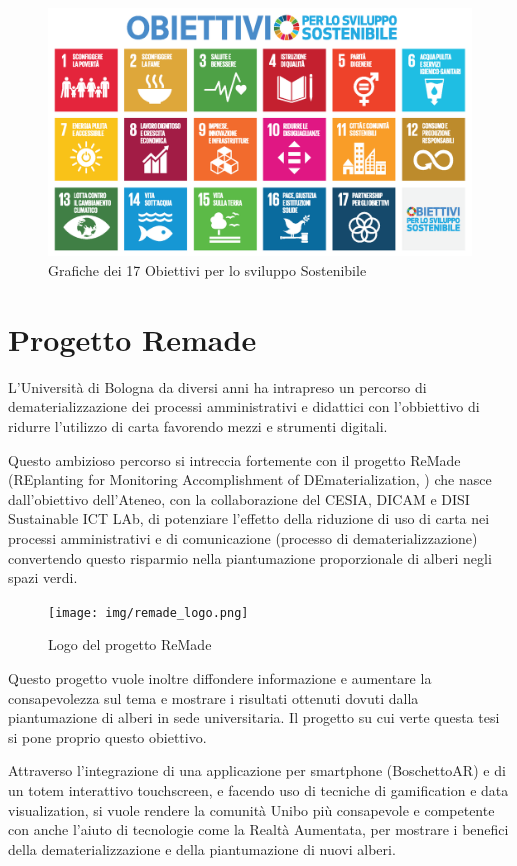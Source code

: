 \begin{figure}
    \centering
    \includegraphics[width=\textwidth]{img/SDG_Poster.png}
    \caption{Grafiche dei 17 Obiettivi per lo sviluppo Sostenibile}
    \label{fig:sdgs}
\end{figure}

\section{Progetto Remade}
L'Università di Bologna da diversi anni ha intrapreso un percorso di dematerializzazione dei processi amministrativi e didattici con l'obbiettivo di ridurre l'utilizzo di carta favorendo mezzi e strumenti digitali.

Questo ambizioso percorso si intreccia fortemente con il progetto ReMade (REplanting for Monitoring Accomplishment of DEmaterialization, \cite{remade_project}) che nasce dall'obiettivo dell'Ateneo, con la collaborazione del CESIA, DICAM e DISI Sustainable ICT LAb, di potenziare l'effetto della riduzione di uso di carta nei processi amministrativi e di comunicazione (processo di dematerializzazione) convertendo questo risparmio nella piantumazione proporzionale di alberi negli spazi verdi.
\begin{figure}
    \center
    \texttt{[image: img/remade\_logo.png]}
    \caption{Logo del progetto ReMade}
    \label{fig:remade_logo}
\end{figure}

Questo progetto vuole inoltre diffondere informazione e aumentare la consapevolezza sul tema e mostrare i risultati ottenuti dovuti dalla piantumazione di alberi in sede universitaria. Il progetto su cui verte questa tesi si pone proprio questo obiettivo.

Attraverso l'integrazione di una applicazione per smartphone (BoschettoAR) e di un totem interattivo touchscreen, e facendo uso di tecniche di gamification e data visualization, si vuole rendere la comunità Unibo più consapevole e competente con anche l'aiuto di tecnologie come la Realtà Aumentata, per mostrare i benefici della dematerializzazione e della piantumazione di nuovi alberi.

